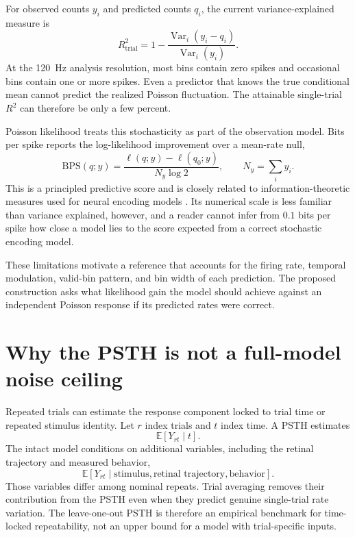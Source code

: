 \documentclass[11pt]{article}
\newcommand{\E}{\mathbb{E}}
\newcommand{\Var}{\operatorname{Var}}
\begin{document}
For observed counts $y_i$ and predicted counts $q_i$, the current variance-explained measure is
\begin{equation}
R^2_{\mathrm{trial}}
=1-\frac{\Var_i(y_i-q_i)}{\Var_i(y_i)}.
\end{equation}
At the 120~Hz analysis resolution, most bins contain zero spikes and occasional bins contain one or more spikes. Even a predictor that knows the true conditional mean cannot predict the realized Poisson fluctuation. The attainable single-trial $R^2$ can therefore be only a few percent.

Poisson likelihood treats this stochasticity as part of the observation model. Bits per spike reports the log-likelihood improvement over a mean-rate null,
\begin{equation}
\mathrm{BPS}(q;y)
=
\frac{\ell(q;y)-\ell(q_0;y)}{N_y\log 2},
\qquad
N_y=\sum_i y_i.
\end{equation}
This is a principled predictive score and is closely related to information-theoretic measures used for neural encoding models \cite{williamson2015,benjamin2018}. Its numerical scale is less familiar than variance explained, however, and a reader cannot infer from $0.1$ bits per spike how close a model lies to the score expected from a correct stochastic encoding model.

These limitations motivate a reference that accounts for the firing rate, temporal modulation, valid-bin pattern, and bin width of each prediction. The proposed construction asks what likelihood gain the model should achieve against an independent Poisson response if its predicted rates were correct.

\section{Why the PSTH is not a full-model noise ceiling}

Repeated trials can estimate the response component locked to trial time or repeated stimulus identity. Let $r$ index trials and $t$ index time. A PSTH estimates
\begin{equation}
\E[Y_{rt}\mid t].
\end{equation}
The intact model conditions on additional variables, including the retinal trajectory and measured behavior,
\begin{equation}
\E[Y_{rt}\mid \text{stimulus},\text{retinal trajectory},\text{behavior}].
\end{equation}
Those variables differ among nominal repeats. Trial averaging removes their contribution from the PSTH even when they predict genuine single-trial rate variation. The leave-one-out PSTH is therefore an empirical benchmark for time-locked repeatability, not an upper bound for a model with trial-specific inputs.
\end{document}
